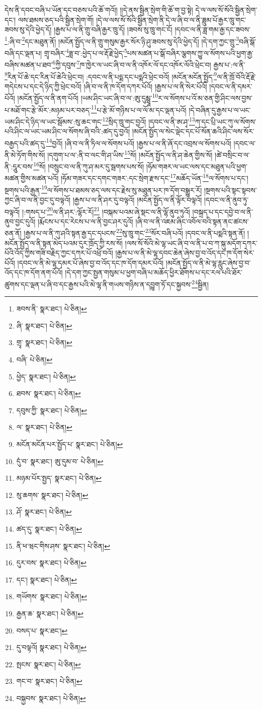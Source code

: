 དེས་ནི་དབང་བཞི་པ་ཡོན་དང་བཅས་པའི་ཆོ་གའོ།། །།དེ་ནས་སྦྱིན་སྲེག་གི་ཆོ་ག་བྱ་སྟེ། དེ་ལ་ལས་སོ་སོའི་སྦྱིན་སྲེག་དང་། ལས་ཐམས་ཅད་པའི་སྦྱིན་སྲེག་གོ། །དེ་ལ་ལས་སོ་སོའི་སྦྱིན་སྲེག་ནི་དེ་ལ་ཞི་བ་ལ་ནི་ཟླུམ་པོ་རྒྱར་ཁྲུ་གང་ཟབས་སུ་དེའི་ཕྱེད་དོ། །རྒྱས་པ་ལ་ནི་གྲུ་བཞི་རྒྱར་ཁྲུ་དོ། །ཟབས་སུ་ཁྲུ་གང་ངོ། །དབང་ལ་ནི་ཟླ་གམ་རྒྱ་དང་ཟབས་\footnote{ཟབས་ནི་  སྣར་ཐང་།  པེ་ཅིན། }:ཞི་བ་\footnote{ཞི་  སྣར་ཐང་།  པེ་ཅིན། }དང་མཐུན་ནོ། །མངོན་སྤྱོད་ལ་ནི་གྲུ་གསུམ་རྒྱར་སོར་ཉི་ཤུ་ཟབས་སུ་དེའི་ཕྱེད་དོ། །དེ་དག་ཀྱང་གྲུ་\footnote{གྲྭ་  སྣར་ཐང་།  པེ་ཅིན། }བཞི་སྒོ་བཞི་དང་ལྡན་པ། གྲྭ་བཞིར་\footnote{བཞི་  པེ་ཅིན། }ཟླ་བ་:ཕྱེད་པ་ལ་རྡོ་རྗེ་ཕྱེད་\footnote{ཕྱེད་  སྣར་ཐང་།  པེ་ཅིན། }པས་མཚན་པ་སྒོ་བཞིར་ལྕགས་ཀྱུ་ལ་སོགས་པའི་ཕྱག་རྒྱ་བཞིས་མཚན་པ་ཐབ་\footnote{ཐབས་  སྣར་ཐང་།  པེ་ཅིན། }ཀྱི་དབུས་\footnote{དབུས་ཀྱི་  སྣར་ཐང་།  པེ་ཅིན། }ཁ་ཁྱེར་ལ་ཡང་ཞི་བ་ལ་ནི་འཁོར་ལོ་དང་འཁོར་ལོའི་ཕྲེང་བ། རྒྱས་པ་:ལ་ནི་\footnote{ལ་  སྣར་ཐང་།  པེ་ཅིན། }རིན་པོ་ཆེ་དང་རིན་པོ་ཆེའི་ཕྲེང་བ། :དབང་ལ་ནི་པདྨ་དང་པདྨའི་ཕྲེང་བའོ། །མངོན་མངོན་སྤྱོད་\footnote{མངོན་མངོན་པར་སྤྱོད་པ་  སྣར་ཐང་།  པེ་ཅིན། }ལ་ནི་ཁྲོ་བོའི་རྡོ་རྗེ་གདེངས་པ་དང་དེ་ཉིད་ཀྱི་ཕྲེང་བའོ། །ཞི་བ་ལ་ནི་ཁ་དོག་དཀར་པོའོ། །རྒྱས་པ་ལ་ནི་སེར་པོའོ། །དབང་ལ་ནི་དམར་པོའོ། །མངོན་སྤྱོད་ལ་ནི་ནག་པོའོ། །ཡམ་ཤིང་ཡང་ཞི་བ་ལ་:ཨུ་དུམྺཱ་\footnote{དུཾ་བ་  སྣར་ཐང་། ཨུ་དུམ་བ་  པེ་ཅིན། }ར་ལ་སོགས་པ་འོ་མ་ཅན་གྱི་ཤིང་ལས་བྱས་པ་མཐོ་གང་རྩེ་མོར་:མཉམ་པར་བཅད་\footnote{མཉམ་པོར་སྤྱད་  སྣར་ཐང་།  པེ་ཅིན། }པ་རྩེ་མོ་གཉིས་པ་ལ་ལོ་མ་དང་ལྡན་པའོ། །དེ་བཞིན་དུ་རྒྱས་པ་ལ་ཡང་ཡམ་ཤིང་དེ་ཉིད་ལ་ཡང་སྦོམས་:སུ་ཆང་གང་\footnote{སུ་ཆགས་  སྣར་ཐང་།  པེ་ཅིན། }སྲིད་ཁྲུ་གང་བྱའོ། །དབང་ལ་ནི་ཨ་ཤྭ་\footnote{ཤོ་  སྣར་ཐང་།  པེ་ཅིན། }ཀ་དང་པྲི་ཡང་ཀུ་ལ་སོགས་པའི་ཤིང་ལ་ཡང་ཡམ་ཤིང་ལ་སོགས་ཞི་བའི་:ཚད་དུ་བྱའོ། །མངོན་སྤྱོད་ལ་སེང་ལྡེང་དང་པོ་སོན་ཆའི་ཤིང་ལས་སོར་བརྒྱད་པའི་ཚད་དུ་\footnote{ཚད་དུ་  སྣར་ཐང་།  པེ་ཅིན། }བྱའོ། །ཞི་བ་ལ་ནི་ཏིལ་ལ་སོགས་པའོ། །རྒྱས་པ་ལ་ནི་ཞོ་དང་འབྲས་ལ་སོགས་པའོ། །དབང་ལ་ནི་མེ་ཏོག་གིས་སོ། །དགུག་པ་ལ་:ནི་བ་ལང་གི་ཤ་ཡིས་\footnote{ནི་ཕ་ཝང་གིས་ཤས་  སྣར་ཐང་།  པེ་ཅིན། }སོ། །མངོན་སྤྱོད་ལ་ནི་ཤ་ཆེན་གྱིས་སོ། །ཚེ་བསྲིང་བ་ལ་ནི་:དཱུར་བས་\footnote{དུར་བས་  སྣར་ཐང་།  པེ་ཅིན། }སོ། །བསྲུང་བ་ལ་ནི་ཀུ་ཤ་མར་དུ་སྦགས་པས་སོ། །ཧོམ་གཟར་ལ་ཡང་ལས་དང་མཐུན་པའི་ཕྱག་མཚན་གྱིས་མཚན་པའོ། །ཧོམ་གཟར་དང་དགང་གཟར་:དང་སྲེག་རྫས་དང་\footnote{དང་།   སྣར་ཐང་།  པེ་ཅིན། }མཆོད་ཡོན་\footnote{གཡོགས་  སྣར་ཐང་།  པེ་ཅིན། }ལ་སོགས་པ་དང་། སྔགས་པའི་རྒྱན་\footnote{རྒྱན་ཆ་  སྣར་ཐང་།  པེ་ཅིན། }ལ་སོགས་པ་ཐམས་ཅད་ལས་དང་རྗེས་སུ་མཐུན་པར་ཁ་དོག་བསྒྱུར་རོ། །སྔགས་པའི་སྟང་སྟབས་ཀྱང་ཞི་བ་ལ་ནི་བྱང་དུ་བལྟའོ། །རྒྱས་པ་ལ་ནི་ཤར་དུ་བལྟའོ། །མངོན་སྤྱོད་ལ་ནི་ལྟོར་བལྟའོ། །དབང་ལ་ནི་ནུབ་ཏུ་བལྟའོ། །:གསད་པ་\footnote{བསད་པ་  སྣར་ཐང་། }ལ་ནི་ཤར་:ལྷོར་རོ།\footnote{དུ་བལྟའོ།  སྣར་ཐང་།  པེ་ཅིན། } །བསྐམ་པའམ་ཞེ་སྡང་ལ་ནི་ལྷོ་ནུབ་ཏུའོ། །བསྐྲད་པ་དང་དབྱེ་བ་ལ་ནི་ནུབ་བྱང་དུའོ། །རྨོངས་པ་དང་རེངས་པ་ལ་ནི་བྱང་ཤར་དུའོ། །ཞི་བ་ལ་ནི་འཇམ་ཞིང་འབོལ་བའི་སྟན་ནང་ཚངས་ཅན་ནོ། །རྒྱས་པ་ལ་ནི་ཀུ་ཤའི་སྟན་རྒྱ་དང་དཔངས་\footnote{སྤངས་  སྣར་ཐང་།  པེ་ཅིན། }སུ་ཁྲུ་གང་\footnote{གང་བ་  སྣར་ཐང་།  པེ་ཅིན། }སོར་བཞི་པའོ། །དབང་ལ་ནི་པདྨའི་སྟན་ནོ། །མངོན་སྤྱོད་ལ་ནི་སྟན་མེད་པའམ་དུར་ཁྲོད་ཀྱི་རས་སོ། །ལས་སོ་སོའི་མེ་ལྷ་ཡང་ཞི་བ་ལ་ནི་པ་བ་ཀ་སྐུ་མདོག་དཀར་པོའི་འོད་ཀྱིས་གཟི་བརྗིད་ཀྱང་དཀར་པོ་འཕྲོ་བའོ། །རྒྱས་པ་ལ་ནི་མེ་ལྷ་དབང་ཆེན་ཞེས་བྱ་བ་འོད་དང་ཁ་དོག་སེར་པོའོ། །དབང་ལ་ནི་མེ་ལྷ་དམར་པོ་ཞེས་བྱ་བ་འོད་དང་ཁ་དོག་དམར་པོའོ། །མངོན་སྤྱོད་ལ་ནི་མེ་ལྷ་རླུང་ཞེས་བྱ་བ་འོད་དང་ཁ་དོག་ནག་པོའོ། །དེ་དག་ཀྱང་སྤྱན་གསུམ་པ་ཕྱག་བཞི་པ་མཆོད་ཕྱིར་ཐོགས་པ་དང་རལ་པའི་ཐོར་ཚུགས་དང་ལྡན་པ་ཞི་བ་དང་རྒྱས་པའི་མེ་ལྷ་ནི་གཡས་གཉིས་ན་དབྱུག་ཏོ་དང་སྐྱབས་\footnote{བསྐྱབས་  སྣར་ཐང་།  པེ་ཅིན། }སྦྱིན། 